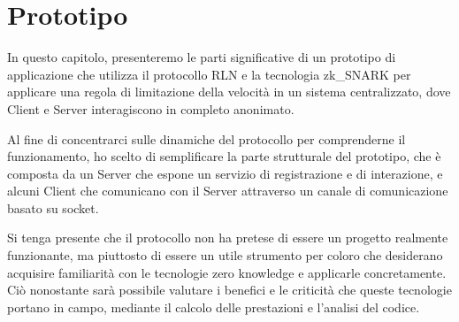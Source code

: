 \chapter*{Prototipo}

In questo capitolo, presenteremo le parti significative di un prototipo di applicazione che utilizza il protocollo RLN e la tecnologia zk\_SNARK  per applicare una regola di limitazione della velocità in un sistema centralizzato, dove Client e Server interagiscono in completo anonimato.

Al fine di concentrarci sulle dinamiche del protocollo per comprenderne il funzionamento, ho scelto di semplificare la parte strutturale del prototipo, che è composta da un Server che espone un servizio di registrazione e di interazione, e alcuni Client che comunicano con il Server attraverso un canale di comunicazione basato su socket.

Si tenga presente che il protocollo non ha pretese di essere un progetto realmente funzionante, ma piuttosto di essere un utile strumento per coloro che desiderano acquisire familiarità con le tecnologie zero knowledge e applicarle concretamente. Ciò nonostante sarà possibile valutare i benefici e le criticità che queste tecnologie portano in campo, mediante il calcolo delle prestazioni e l'analisi del codice.

